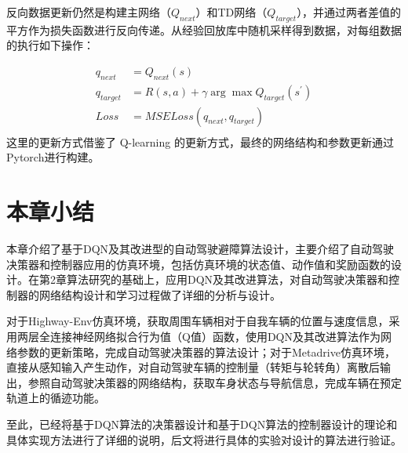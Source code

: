反向数据更新仍然是构建主网络（$Q_{next}$）和TD网络（$Q_{target}$），并通过两者差值的平方作为损失函数进行反向传递。从经验回放库中随机采样得到数据，对每组数据的执行如下操作：

\begin{equation}
    \begin{aligned}
        q_{next} &= Q_{next}(s)\\
        q_{target} &= R(s,a) + \gamma \arg \max Q_{target}(s^{'})\\
        Loss &= MSELoss(q_{next},q_{target})\\
    \end{aligned}
\end{equation}
这里的更新方式借鉴了 Q-learning 的更新方式，最终的网络结构和参数更新通过Pytorch进行构建。

\section{本章小结} %

本章介绍了基于DQN及其改进型的自动驾驶避障算法设计，主要介绍了自动驾驶决策器和控制器应用的仿真环境，包括仿真环境的状态值、动作值和奖励函数的设计。在第2章算法研究的基础上，应用DQN及其改进算法，对自动驾驶决策器和控制器的网络结构设计和学习过程做了详细的分析与设计。

对于Highway-Env仿真环境，获取周围车辆相对于自我车辆的位置与速度信息，采用两层全连接神经网络拟合行为值（Q值）函数，使用DQN及其改进算法作为网络参数的更新策略，完成自动驾驶决策器的算法设计；对于Metadrive仿真环境，直接从感知输入产生动作，对自动驾驶车辆的控制量（转矩与轮转角）离散后输出，参照自动驾驶决策器的网络结构，获取车身状态与导航信息，完成车辆在预定轨道上的循迹功能。

至此，已经将基于DQN算法的决策器设计和基于DQN算法的控制器设计的理论和具体实现方法进行了详细的说明，后文将进行具体的实验对设计的算法进行验证。
